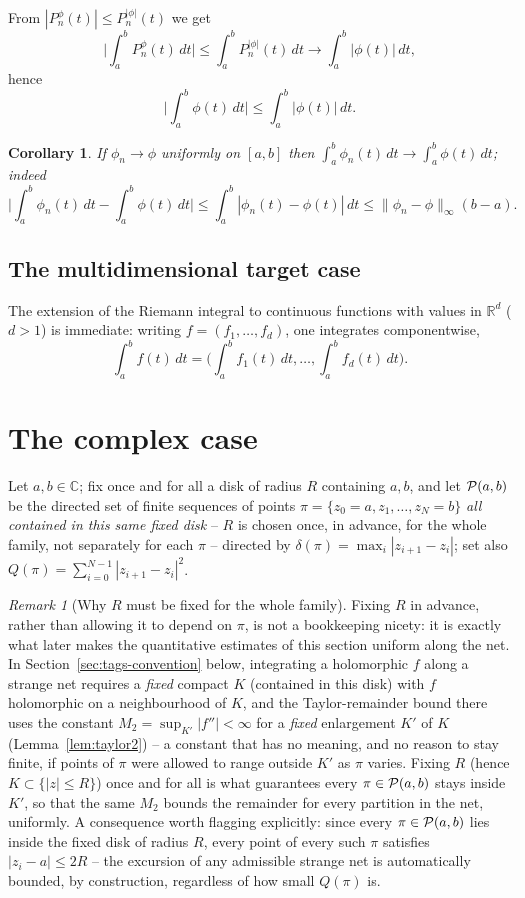 \documentclass[11pt,fleqn]{article}
\def\C{\mathbb C}
\def\R{\mathbb R}
\theoremstyle{plain}
\newtheorem{cor}[thm]{Corollary}
\theoremstyle{remark}
\newtheorem{remark}[thm]{Remark}
\begin{document}
From $|P_n^\phi(t)|\le P_n^{|\phi|}(t)$ we get
\[
\Big|\int_a^b P_n^\phi(t)\,dt\Big|\le\int_a^bP_n^{|\phi|}(t)\,dt
\longrightarrow\int_a^b|\phi(t)|\,dt,
\]
hence
\[
\Big|\int_a^b\phi(t)\,dt\Big|\le\int_a^b|\phi(t)|\,dt.
\]

\begin{cor}
If $\phi_n\to\phi$ uniformly on $[a,b]$ then
$\int_a^b\phi_n(t)\,dt\to\int_a^b\phi(t)\,dt$; indeed
\[
\Big|\int_a^b\phi_n(t)\,dt-\int_a^b\phi(t)\,dt\Big|
\le\int_a^b|\phi_n(t)-\phi(t)|\,dt\le\|\phi_n-\phi\|_\infty(b-a).
\]
\end{cor}

\subsection{The multidimensional target case}

The extension of the Riemann integral to continuous functions with values
in $\R^d$ ($d>1$) is immediate: writing $f=(f_1,\ldots,f_d)$, one
integrates componentwise,
\[
\int_a^bf(t)\,dt=\Big(\int_a^bf_1(t)\,dt,\ldots,\int_a^bf_d(t)\,dt\Big).
\]

\section{The complex case}

Let $a,b\in\C$; fix once and for all a disk of radius $R$ containing
$a,b$, and let ${\cal P}(a,b)$ be the directed set of finite sequences of
points $\pi=\{z_0=a,z_1,\ldots,z_N=b\}$ \emph{all contained in this same
fixed disk} -- $R$ is chosen once, in advance, for the whole family, not
separately for each $\pi$ -- directed by $\delta(\pi)=\max_i|z_{i+1}-z_i|$;
set also $Q(\pi)=\sum_{i=0}^{N-1}|z_{i+1}-z_i|^2$.

\begin{remark}[Why $R$ must be fixed for the whole family]\label{rem:fixed-R}
Fixing $R$ in advance, rather than allowing it to depend on $\pi$, is not
a bookkeeping nicety: it is exactly what later makes the quantitative
estimates of this section uniform along the net. In
Section~\ref{sec:tags-convention} below, integrating a holomorphic $f$
along a strange net requires a \emph{fixed} compact $K$ (contained in
this disk) with $f$ holomorphic on a neighbourhood of $K$, and the
Taylor-remainder bound there uses the constant
$M_2=\sup_{K'}|f''|<\infty$ for a \emph{fixed} enlargement $K'$ of $K$
(Lemma~\ref{lem:taylor2}) -- a constant that has no meaning, and no
reason to stay finite, if points of $\pi$ were allowed to range outside
$K'$ as $\pi$ varies. Fixing $R$ (hence $K\subset\{|z|\le R\}$) once and
for all is what guarantees every $\pi\in{\cal P}(a,b)$ stays inside $K'$,
so that the same $M_2$ bounds the remainder for every partition in the
net, uniformly. A consequence worth flagging explicitly: since every
$\pi\in{\cal P}(a,b)$ lies inside the fixed disk of radius $R$, every
point of every such $\pi$ satisfies $|z_i-a|\le2R$ -- the excursion of
any admissible strange net is automatically bounded, by construction,
regardless of how small $Q(\pi)$ is.
\end{remark}
\end{document}

